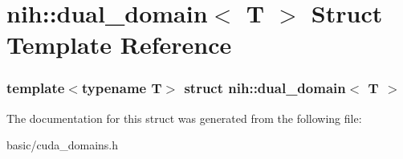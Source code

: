 \hypertarget{structnih_1_1dual__domain}{
\section{nih\-:\-:dual\-\_\-domain$<$ \-T $>$ \-Struct \-Template \-Reference}
\label{structnih_1_1dual__domain}
}
\subsubsection*{template$<$typename T$>$ struct nih\-::dual\-\_\-domain$<$ T $>$}



\-The documentation for this struct was generated from the following file\-:\begin{DoxyCompactItemize}
\item 
basic/cuda\-\_\-domains.\-h\end{DoxyCompactItemize}
